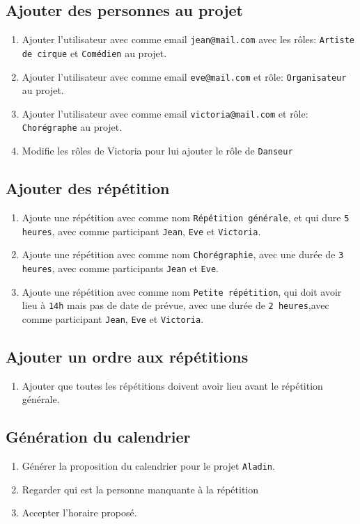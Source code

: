 \documentclass[11pt]{article}
\begin{document}
\subsection{Ajouter des personnes au projet}
\begin{enumerate}
    \item Ajouter l'utilisateur avec comme email \texttt{jean@mail.com} avec les rôles: \texttt{Artiste de cirque} et \texttt{Comédien} au projet.
    \item Ajouter l'utilisateur avec comme email \texttt{eve@mail.com} et rôle: \texttt{Organisateur} au projet.
    \item Ajouter l'utilisateur avec comme email \texttt{victoria@mail.com} et rôle: \texttt{Chorégraphe} au projet. %
    \item Modifie les rôles de Victoria pour lui ajouter le rôle de \texttt{Danseur}
\end{enumerate}
\subsection{Ajouter des répétition}
\begin{enumerate}
    \item Ajoute une répétition avec comme nom \texttt{Répétition générale}, et qui dure \texttt{5 heures}, avec comme participant \texttt{Jean}, \texttt{Eve} et \texttt{Victoria}.
    \item Ajoute une répétition avec comme nom \texttt{Chorégraphie}, avec une durée de \texttt{3 heures}, avec comme participants \texttt{Jean} et \texttt{Eve}.
    \item Ajoute une répétition avec comme nom \texttt{Petite répétition}, qui doit avoir lieu à \texttt{14h} mais pas de date de prévue, avec une durée de \texttt{2 heures},avec comme participant \texttt{Jean}, \texttt{Eve} et \texttt{Victoria}.
\end{enumerate}
\subsection{Ajouter un ordre aux répétitions}
\begin{enumerate}
    \item Ajouter que toutes les répétitions doivent avoir lieu avant le répétition générale.
\end{enumerate}
\subsection{Génération du calendrier}
\begin{enumerate}
    \item Générer la proposition du calendrier pour le projet \texttt{Aladin}.
    \item Regarder qui est la personne manquante à la répétition \texttt{} %
    \item Accepter l'horaire proposé.
\end{enumerate}
\end{document}
